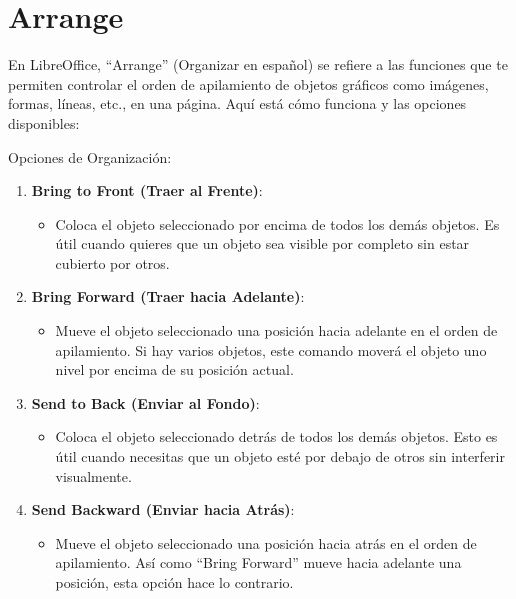 \documentclass[
  jou,
  floatsintext,
  longtable,
  a4paper,
  nolmodern,
  notxfonts,
  notimes,
  colorlinks=true,linkcolor=blue,citecolor=blue,urlcolor=blue]{apa7}
\providecommand{\tightlist}{%
  \setlength{\itemsep}{0pt}\setlength{\parskip}{0pt}}
\begin{document}
\section{Arrange}\label{arrange}

En LibreOffice, ``Arrange'' (Organizar en español) se refiere a las
funciones que te permiten controlar el orden de apilamiento de objetos
gráficos como imágenes, formas, líneas, etc., en una página. Aquí está
cómo funciona y las opciones disponibles:

Opciones de Organización:

\begin{enumerate}
\def\labelenumi{\arabic{enumi}.}
\item
  \textbf{Bring to Front (Traer al Frente)}:

  \begin{itemize}
  \tightlist
  \item
    Coloca el objeto seleccionado por encima de todos los demás objetos.
    Es útil cuando quieres que un objeto sea visible por completo sin
    estar cubierto por otros.
  \end{itemize}
\item
  \textbf{Bring Forward (Traer hacia Adelante)}:

  \begin{itemize}
  \tightlist
  \item
    Mueve el objeto seleccionado una posición hacia adelante en el orden
    de apilamiento. Si hay varios objetos, este comando moverá el objeto
    uno nivel por encima de su posición actual.
  \end{itemize}
\item
  \textbf{Send to Back (Enviar al Fondo)}:

  \begin{itemize}
  \tightlist
  \item
    Coloca el objeto seleccionado detrás de todos los demás objetos.
    Esto es útil cuando necesitas que un objeto esté por debajo de otros
    sin interferir visualmente.
  \end{itemize}
\item
  \textbf{Send Backward (Enviar hacia Atrás)}:

  \begin{itemize}
  \tightlist
  \item
    Mueve el objeto seleccionado una posición hacia atrás en el orden de
    apilamiento. Así como ``Bring Forward'' mueve hacia adelante una
    posición, esta opción hace lo contrario.
  \end{itemize}
\end{enumerate}
\end{document}
